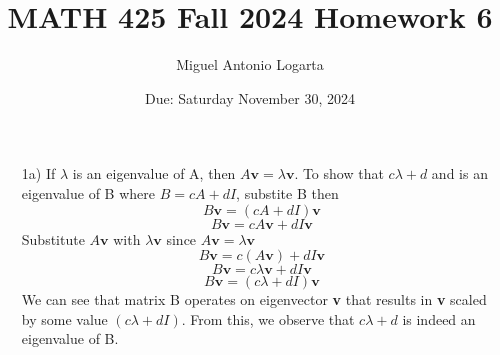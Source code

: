 \documentclass{article}
\title{MATH 425 Fall 2024 Homework 6}
\date{Due: Saturday November 30, 2024}
\author{Miguel Antonio Logarta}
\begin{document}
\maketitle  %
\thispagestyle{fancy}

\begin{enumerate}
    \item[1a)] If $\lambda$ is an eigenvalue of A, then $A\textbf{v} = \lambda \textbf{v}$. 
    To show that $c\lambda + d$ and  is an eigenvalue of B where $B = cA + dI$, substite B then\\
                $$B\textbf{v} = (cA + dI)\textbf{v}$$
                $$B\textbf{v} = cA\textbf{v} + dI\textbf{v}$$
                Substitute $A\textbf{v}$ with $\lambda \textbf{v}$ since $A\textbf{v} = \lambda\textbf{v}$
                $$B\textbf{v} = c(A\textbf{v}) + dI\textbf{v}$$
                $$B\textbf{v} = c\lambda \textbf{v} + dI\textbf{v}$$
                $$B\textbf{v} = (c\lambda + dI)\textbf{v}$$
    We can see that matrix B operates on eigenvector \textbf{v} that results in \textbf{v} scaled by some value $(c\lambda + dI)$. From this, we observe that $c\lambda + d$ is indeed an eigenvalue of B.


\end{enumerate}
\end{document}
